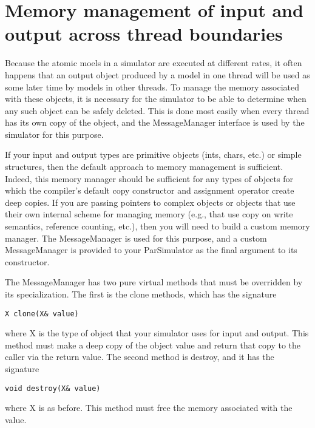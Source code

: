 \section{Memory management of input and output across thread boundaries}
Because the atomic moels in a simulator are executed at different rates, it often happens that an output object produced by a model in one thread will be used as some later time by models in other threads. To manage the memory associated with these objects, it is necessary for the simulator to be able to determine when any such object can be safely deleted. This is done most easily when every thread has its own copy of the object, and the MessageManager interface is used by the simulator for this purpose.

If your input and output types are primitive objects (ints, chars, etc.) or simple structures, then the default approach to memory management is sufficient. Indeed, this memory manager should be sufficient for any types of objects for which the compiler's default copy constructor and assignment operator create deep copies. If you are passing pointers to complex objects or objects that use their own internal scheme for managing memory (e.g., that use copy on write semantics, reference counting, etc.), then you will need to build a custom memory manager. The MessageManager is used for this purpose, and a custom MessageManager is provided to your ParSimulator as the final argument to its constructor.

The MessageManager has two pure virtual methods that must be overridden by its specialization. The first is the clone methods, which has the signature
\begin{verbatim}
X clone(X& value)
\end{verbatim}
where X is the type of object that your simulator uses for input and output. This method must make a deep copy of the object value and return that copy to the caller via the return value. The second method is destroy, and it has the signature
\begin{verbatim}
void destroy(X& value)
\end{verbatim}
where X is as before. This method must free the memory associated with the value. 

